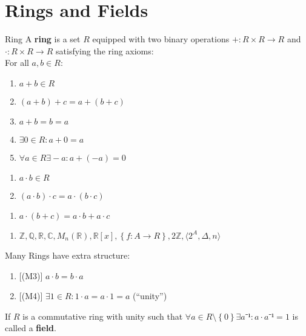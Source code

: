 \documentclass[english]{lbscript}
\begin{document}
\section{Rings and Fields}
\label{sec:rings-fields}

\begin{definition}{Ring}{}
  A \textbf{ring} is a set \(R\) equipped with two binary operations \(+:R×R→R\) and \(⋅:R×R→R\) satisfying the ring axioms:\\
  For all \(a, b∈R:\)
  \begin{enumerate}[label=(A\arabic{*})]
    \item\label{item:45} \(a+b∈R\)
    \item\label{item:46} \((a+b)+c=a+(b+c)\)
    \item\label{item:47} \(a+b=b=a\)
    \item\label{item:48} \(∃0∈R:a+0=a\)
    \item\label{item:49} \(∀a∈R∃-a: a+(-a)=0\)
  \end{enumerate}
  \begin{enumerate}[label=(M\arabic{*})]
    \item\label{item:50} \(a⋅b∈R\)
    \item\label{item:51} \((a⋅b)⋅c=a⋅(b⋅c)\)
  \end{enumerate}
  \begin{enumerate}[label=(D)]
    \item\label{item:52} \(a⋅(b+c)=a⋅b+a⋅c\)
  \end{enumerate}
\end{definition}

\begin{example}{}{}
  \begin{enumerate}
    \item\label{item:53} \(ℤ, ℚ, ℝ, ℂ, M_{n}(ℝ), ℝ[x], \left\{ f: A→R \right\}, 2ℤ, ⟨2^{A}, 𝛥, n⟩ \)
  \end{enumerate}
\end{example}
\begin{remark}{}{}
  Many Rings have extra structure:
  \begin{enumerate}
    \item\label{item:54}[(M3)] \(a⋅b=b⋅a\)
    \item\label{item:55}[(M4)] \(∃1∈R: 1⋅a=a⋅1=a\) (\enquote{unity})
  \end{enumerate}
\end{remark}

\begin{definition}{}{}
  If \(R\) is a commutative ring with unity such that \(∀a∈R\setminus\left\{0\right\}∃a⁻¹: a⋅a⁻¹=1 \) is called a \textbf{field}.
\end{definition}
\end{document}
